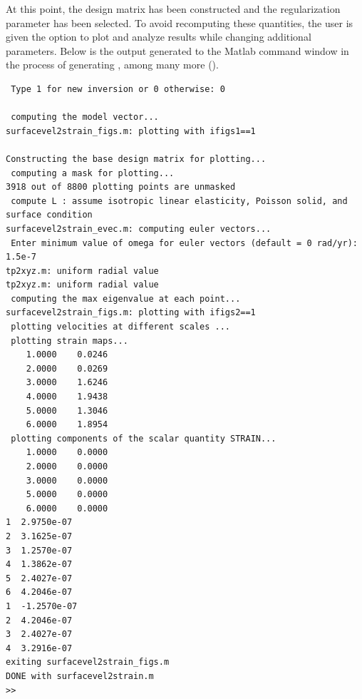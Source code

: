 \documentclass[11pt,titlepage,fleqn]{article}
\begin{document}
\noindent
At this point, the design matrix has been constructed and the regularization parameter has been selected. To avoid recomputing these quantities, the user is given the option to plot and analyze results while changing additional parameters. Below is the output generated to the Matlab command window in the process of generating , among many more ().

\begin{spacing}{1.0}
\begin{verbatim}
 Type 1 for new inversion or 0 otherwise: 0
  
 computing the model vector...
surfacevel2strain_figs.m: plotting with ifigs1==1
  
Constructing the base design matrix for plotting...
 computing a mask for plotting...
3918 out of 8800 plotting points are unmasked
 compute L : assume isotropic linear elasticity, Poisson solid, and surface condition
surfacevel2strain_evec.m: computing euler vectors...
 Enter minimum value of omega for euler vectors (default = 0 rad/yr): 1.5e-7
tp2xyz.m: uniform radial value
tp2xyz.m: uniform radial value
 computing the max eigenvalue at each point...
surfacevel2strain_figs.m: plotting with ifigs2==1
 plotting velocities at different scales ...
 plotting strain maps...
    1.0000    0.0246
    2.0000    0.0269
    3.0000    1.6246
    4.0000    1.9438
    5.0000    1.3046
    6.0000    1.8954
 plotting components of the scalar quantity STRAIN...
    1.0000    0.0000
    2.0000    0.0000
    3.0000    0.0000
    5.0000    0.0000
    6.0000    0.0000
1  2.9750e-07
2  3.1625e-07
3  1.2570e-07
4  1.3862e-07
5  2.4027e-07
6  4.2046e-07
1  -1.2570e-07
2  4.2046e-07
3  2.4027e-07
4  3.2916e-07
exiting surfacevel2strain_figs.m
DONE with surfacevel2strain.m
>> 
\end{verbatim}
\end{spacing}


\normalsize
\end{document}
